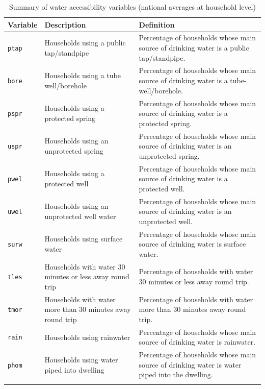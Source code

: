 \documentclass[10pt,twoside]{article}
\numberwithin{equation}{section}
\newcommand{\?}{\stackrel{?}{=}}
\begin{document}
\begin{table}[h!]
  \centering
  \begin{tabular}{p{1in} p{3in} p{2in}}\toprule
    \bf Variable & \bf Description & \bf Definition \\\midrule
    \texttt{ptap} & Households using a public tap/standpipe
 & Percentage of households whose main source of drinking water is a public tap/standpipe.
 \\\midrule
 \texttt{bore} & Households using a tube well/borehole & Percentage of households whose main source of drinking water is a tube-well/borehole.
\\\midrule
\texttt{pspr} & Households using a protected spring
& Percentage of households whose main source of drinking water is a protected spring.
\\\midrule
\texttt{uspr} & Households using an unprotected spring
& Percentage of households whose main source of drinking water is an unprotected spring.
\\\midrule
\texttt{pwel} & Households using a protected well
& Percentage of households whose main source of drinking water is a protected well.
\\\midrule
\texttt{uwel} & Households using an unprotected well water
&Percentage of households whose main source of drinking water is an unprotected well.
\\\midrule
\texttt{surw} & Households using surface water
& Percentage of households whose main source of drinking water is surface water.
\\\midrule
\texttt{tles} & Households with water 30 minutes or less away round trip
&Percentage of households with water 30 minutes or less away round trip.
\\\midrule 
\texttt{tmor} & Households with water more than 30 minutes away round trip & Percentage of households with water more than 30 minutes away round trip.
\\\midrule
\texttt{rain} & Households using rainwater
& Percentage of households whose main source of drinking water is rainwater.
\\\midrule
\texttt{phom} & Households using water piped into dwelling
&Percentage of households whose main source of drinking water is water piped into the dwelling.
\\\midrule

& \\\bottomrule
  \end{tabular}
  \caption{Summary of water accessibility variables (national averages at household level)}
  \label{tab:summary-wa}
\end{table}
\end{document}
